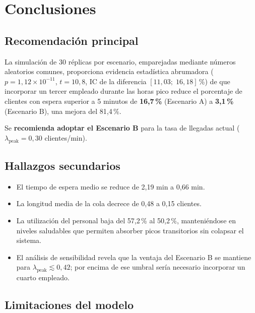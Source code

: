 \section{Conclusiones}

\subsection{Recomendación principal}

La simulación de 30 réplicas por escenario, emparejadas mediante números
aleatorios comunes, proporciona evidencia estadística abrumadora ($p = 1{,}12 \times 10^{-11}$,
$t = 10{,}8$, IC de la diferencia $[11{,}03;\;16{,}18]$\,\%) de que incorporar
un tercer empleado durante las horas pico reduce el porcentaje de clientes
con espera superior a 5 minutos de \textbf{16{,}7\,\%} (Escenario A) a
\textbf{3{,}1\,\%} (Escenario B), una mejora del 81{,}4\,\%.

Se \textbf{recomienda adoptar el Escenario B} para la tasa de llegadas actual
($\lambda_{\text{peak}} = 0{,}30$ clientes/min).

\subsection{Hallazgos secundarios}

\begin{itemize}
  \item El tiempo de espera medio se reduce de 2{,}19 min a 0{,}66 min.
  \item La longitud media de la cola decrece de 0{,}48 a 0{,}15 clientes.
  \item La utilización del personal baja del 57{,}2\,\% al 50{,}2\,\%,
    manteniéndose en niveles saludables que permiten absorber picos
    transitorios sin colapsar el sistema.
  \item El análisis de sensibilidad revela que la ventaja del Escenario B
    se mantiene para $\lambda_{\text{peak}} \lesssim 0{,}42$; por encima de
    ese umbral sería necesario incorporar un cuarto empleado.
\end{itemize}

\subsection{Limitaciones del modelo}

